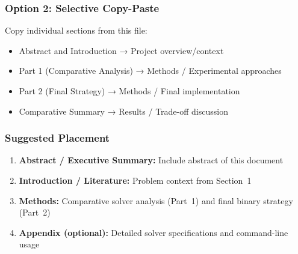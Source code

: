 \documentclass[11pt,a4paper]{article}
\begin{document}
\subsubsection{Option 2: Selective Copy-Paste}

Copy individual sections from this file:
\begin{itemize}
    \item Abstract and Introduction → Project overview/context
    \item Part 1 (Comparative Analysis) → Methods / Experimental approaches
    \item Part 2 (Final Strategy) → Methods / Final implementation
    \item Comparative Summary → Results / Trade-off discussion
\end{itemize}

\subsubsection{Suggested Placement}

\begin{enumerate}
    \item \textbf{Abstract / Executive Summary:} Include abstract of this document
    \item \textbf{Introduction / Literature:} Problem context from Section~1
    \item \textbf{Methods:} Comparative solver analysis (Part~1) and final binary strategy (Part~2)
    \item \textbf{Appendix (optional):} Detailed solver specifications and command-line usage
\end{enumerate}
\end{document}
